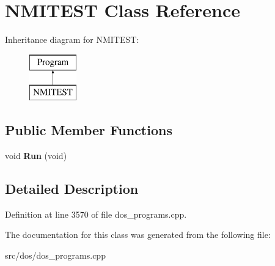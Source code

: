 \hypertarget{classNMITEST}{\section{N\-M\-I\-T\-E\-S\-T Class Reference}
\label{classNMITEST}
}
Inheritance diagram for N\-M\-I\-T\-E\-S\-T\-:\begin{figure}[H]
\begin{center}
\leavevmode
\includegraphics[height=2.000000cm]{classNMITEST}
\end{center}
\end{figure}
\subsection*{Public Member Functions}
\begin{DoxyCompactItemize}
\item 
\hypertarget{classNMITEST_a5ce5aded9d44d5eacd3c640455207076}{void {\bfseries Run} (void)}\label{classNMITEST_a5ce5aded9d44d5eacd3c640455207076}

\end{DoxyCompactItemize}


\subsection{Detailed Description}


Definition at line 3570 of file dos\-\_\-programs.\-cpp.



The documentation for this class was generated from the following file\-:\begin{DoxyCompactItemize}
\item 
src/dos/dos\-\_\-programs.\-cpp\end{DoxyCompactItemize}
